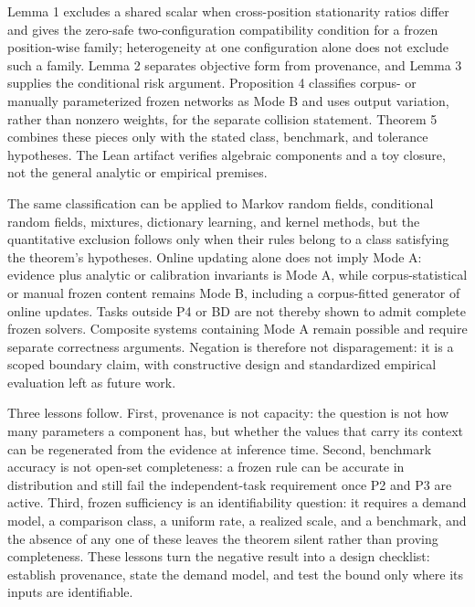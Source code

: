 \documentclass[twoside,11pt]{article}
\begin{document}
Lemma 1 excludes a shared scalar when cross-position stationarity ratios differ and gives the zero-safe two-configuration compatibility condition for a frozen position-wise family; heterogeneity at one configuration alone does not exclude such a family. Lemma 2 separates objective form from provenance, and Lemma 3 supplies the conditional risk argument. Proposition 4 classifies corpus- or manually parameterized frozen networks as Mode B and uses output variation, rather than nonzero weights, for the separate collision statement. Theorem 5 combines these pieces only with the stated class, benchmark, and tolerance hypotheses. The Lean artifact verifies algebraic components and a toy closure, not the general analytic or empirical premises.

The same classification can be applied to Markov random fields, conditional random fields, mixtures, dictionary learning, and kernel methods, but the quantitative exclusion follows only when their rules belong to a class satisfying the theorem's hypotheses. Online updating alone does not imply Mode A: evidence plus analytic or calibration invariants is Mode A, while corpus-statistical or manual frozen content remains Mode B, including a corpus-fitted generator of online updates. Tasks outside P4 or BD are not thereby shown to admit complete frozen solvers. Composite systems containing Mode A remain possible and require separate correctness arguments. Negation is therefore not disparagement: it is a scoped boundary claim, with constructive design and standardized empirical evaluation left as future work.

Three lessons follow. First, provenance is not capacity: the question is not how many parameters a component has, but whether the values that carry its context can be regenerated from the evidence at inference time. Second, benchmark accuracy is not open-set completeness: a frozen rule can be accurate in distribution and still fail the independent-task requirement once P2 and P3 are active. Third, frozen sufficiency is an identifiability question: it requires a demand model, a comparison class, a uniform rate, a realized scale, and a benchmark, and the absence of any one of these leaves the theorem silent rather than proving completeness. These lessons turn the negative result into a design checklist: establish provenance, state the demand model, and test the bound only where its inputs are identifiable.
\end{document}
